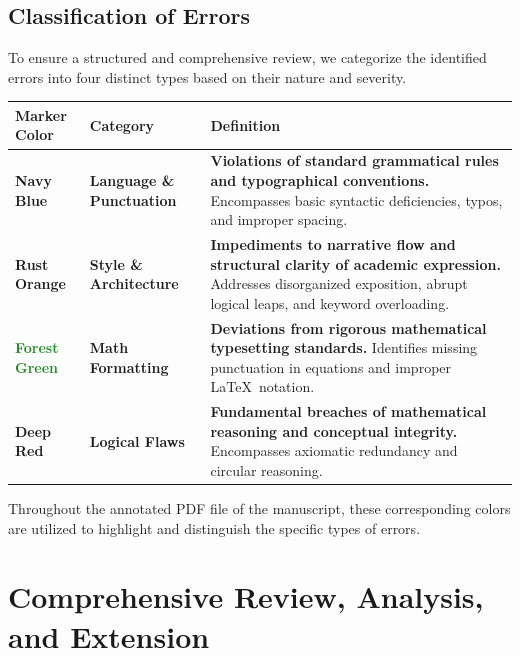\documentclass[11pt, a4paper]{article}
\begin{document}
\vspace{0.5cm} %

\subsection{Classification of Errors}


To ensure a structured and comprehensive review, we categorize the identified errors into four distinct types based on their nature and severity.

\begin{table}[htbp]
\centering
\renewcommand{\arraystretch}{1.5}
\begin{tabularx}{\textwidth}{l >{\raggedright\arraybackslash}p{3.5cm} X}
\toprule
\textbf{Marker Color} & \textbf{Category} & \textbf{Definition} \\
\midrule
\textcolor{NavyBlue}{\textbf{Navy Blue}} & \textbf{Language \& Punctuation} & \textbf{Violations of standard grammatical rules and typographical conventions.} Encompasses basic syntactic deficiencies, typos, and improper spacing. \\

\textcolor{RustOrange}{\textbf{Rust Orange}} & \textbf{Style \& Architecture} & \textbf{Impediments to narrative flow and structural clarity of academic expression.} Addresses disorganized exposition, abrupt logical leaps, and keyword overloading. \\

\textcolor{ForestGreen}{\textbf{Forest Green}} & \textbf{Math Formatting} & \textbf{Deviations from rigorous mathematical typesetting standards.} Identifies missing punctuation in equations and improper \LaTeX~notation. \\

\textcolor{DeepRed}{\textbf{Deep Red}} & \textbf{Logical Flaws} & \textbf{Fundamental breaches of mathematical reasoning and conceptual integrity.} Encompasses axiomatic redundancy and circular reasoning. \\
\bottomrule
\end{tabularx}
\end{table}
Throughout the annotated PDF file of the manuscript, these corresponding colors are utilized to highlight and distinguish the specific types of errors.

\newpage 
\section{Comprehensive Review, Analysis, and Extension}
\end{document}

